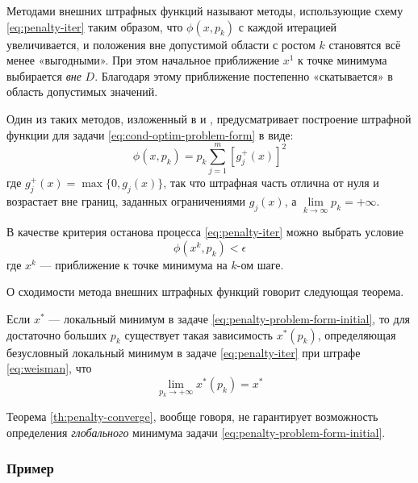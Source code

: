 Методами внешних штрафных функций называют методы, использующие схему
\eqref{eq:penalty-iter} таким образом, что $\phi(x, p_k)$ с каждой
итерацией увеличивается, и положения вне допустимой области с ростом
$k$ становятся всё менее «выгодными». При этом начальное приближение
$x^1$ к точке минимума выбирается \emph{вне} $D$. Благодаря этому
приближение постепенно «скатывается» в область допустимых значений.

Один из таких методов, изложенный в \cite{himmelblau75} и
\cite{gill81}, предусматривает построение штрафной функции для задачи
\eqref{eq:cond-optim-problem-form} в виде:
\begin{equation}
  \label{eq:weisman}
  \phi(x, p_k) = p_k \sum_{j=1}^m{ \left [ g_j^+(x) \right ]^2}
\end{equation}
где $g_j^+(x) = \max\{0, g_j(x)\}$, так что штрафная часть отлична от
нуля и возрастает вне границ, заданных ограничениями $g_j(x)$, а
$\lim\limits_{k\to\infty}{p_k} = +\infty$.

В качестве критерия останова процесса \eqref{eq:penalty-iter} можно
выбрать условие
\begin{equation*}
  \phi(x^k, p_k) < \epsilon
\end{equation*}
где $x^k$ — приближение к точке минимума на $k$-ом шаге.

О сходимости метода внешних штрафных функций говорит следующая
теорема.
\begin{thm}
  \label{th:penalty-converge}
  Если $x^*$ — локальный минимум в задаче
  \eqref{eq:penalty-problem-form-initial}, то для достаточно больших
  $p_k$ существует такая зависимость $x^*(p_k)$, определяющая
  безусловный локальный минимум в задаче \eqref{eq:penalty-iter} при
  штрафе \eqref{eq:weisman}, что
  \begin{equation}
    \lim_{p_k \to +\infty}{x^*(p_k)} = x^*
  \end{equation}
\end{thm}

\begin{rem}
  \label{rem:penalty-convex-is-good}
  Теорема \eqref{th:penalty-converge}, вообще говоря, не гарантирует
  возможность определения \emph{глобального} минимума задачи
  \eqref{eq:penalty-problem-form-initial}.
\end{rem}

\subsubsection{Пример}
\label{sec:penalty-usage}


